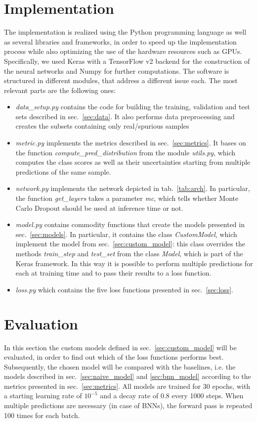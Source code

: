 \documentclass[11pt,twoside,a4paper]{article}
\begin{document}
\section{Implementation}
\label{sec:implementation}
The implementation is realized using the Python programming language as well as several libraries and frameworks, in order to speed up the implementation process while also optimizing the use of the hardware resources such as GPUs. Specifically, we used Keras with a TensorFlow v2 backend for the construction of the neural networks and Numpy for further computations.\newline
The software is structured in different modules, that address a different issue each. The most relevant parts are the following ones:
\begin{itemize}
\item \emph{data\_setup.py} contains the code for building the training, validation and test sets described in sec.~\ref{sec:data}. It also performs data preprocessing and creates the subsets containing only real/spurious samples
\item \emph{metric.py} implements the metrics described in sec.~\ref{sec:metrics}. It bases on the function \emph{compute\_pred\_distribution} from the module \emph{utils.py}, which computes the class scores as well as their uncertainties starting from multiple predictions of the same sample.
\item \emph{network.py} implements the network depicted in tab.~\ref{tab:arch}. In particular, the function \emph{get\_layers} takes a parameter \emph{mc}, which tells whether Monte Carlo Dropout should be used at inference time or not.
\item \emph{model.py} contains commodity functions that create the models presented in sec.~\ref{sec:models}. In particular, it contains the class \emph{CustomModel}, which implement the model from sec.~\ref{sec:custom_model}: this class overrides the methods \emph{train\_step} and \emph{test\_set} from the class \emph{Model}, which is part of the Keras framework. In this way it is possible to perform multiple predictions for each at training time and to pass their results to a loss function.
\item \emph{loss.py} which contains the five loss functions presented in sec.~\ref{sec:loss}.
\end{itemize}


\section{Evaluation}
\label{sec:evaluation}
In this section the custom models defined in sec.~\ref{sec:custom_model} will be evaluated, in order to find out which of the loss functions performs best. Subsequently, the chosen model will be compared with the baselines, i.e. the models described in sec.~\ref{sec:naive_model} and \ref{sec:bnn_model} according to the metrics presented in sec.~\ref{sec:metrics}. All models are trained for 30 epochs, with a starting learning rate of \(10^{-5}\) and a decay rate of 0.8 every 1000 steps. When multiple predictions are necessary (in case of BNNs), the forward pass is repeated 100 times for each batch.
\end{document}
